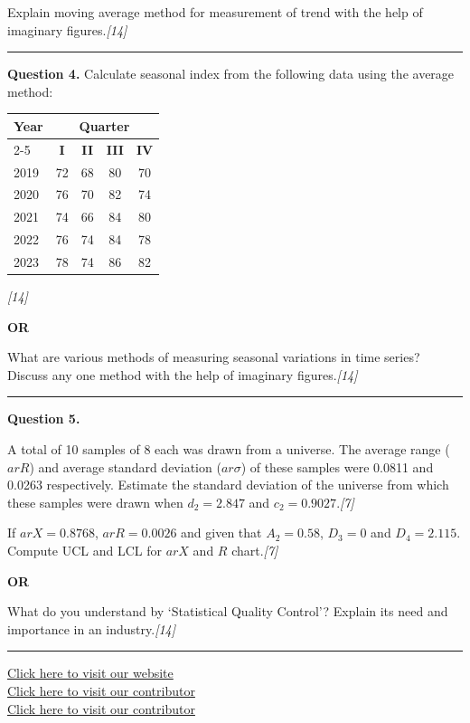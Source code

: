 \documentclass[11pt,a4paper]{article}
\newcommand{\pts}[1]{\hfill   \textit{[#1]}}
\begin{document}
Explain moving average method for measurement of trend with the help of imaginary figures.\pts{14}

\medskip\rule{\linewidth}{0.2pt}

\pagebreak




\noindent   \textbf{Question 4.}
Calculate seasonal index from the following data using the average method:


\begin{center}
\small

\begin{tabular}{|l|c|c|c|c|}
\hline
   \textbf{Year} & \multicolumn{4}{c|}{   \textbf{Quarter}} \\
\cline{2-5}
&   \textbf{I} &   \textbf{II} &   \textbf{III} &   \textbf{IV} \\
\hline
2019 & 72 & 68 & 80 & 70 \\
2020 & 76 & 70 & 82 & 74 \\
2021 & 74 & 66 & 84 & 80 \\
2022 & 76 & 74 & 84 & 78 \\
2023 & 78 & 74 & 86 & 82 \\
\hline
\end{tabular}
\end{center}\pts{14}

\centerline{   \textbf{OR}}

What are various methods of measuring seasonal variations in time series? Discuss any one method with the help of imaginary figures.\pts{14}

\medskip\rule{\linewidth}{0.2pt}




\noindent   \textbf{Question 5.}

\begin{parts}
  \item A total of 10 samples of 8 each was drawn from a universe. The average range ($ar{R}$) and average standard deviation ($ar{\sigma}$) of these samples were 0.0811 and 0.0263 respectively. Estimate the standard deviation of the universe from which these samples were drawn when $d_2 = 2.847$ and $c_2 = 0.9027$.\pts{7}
  \item If $ar{X} = 0.8768$, $ar{R} = 0.0026$ and given that $A_2 = 0.58$, $D_3 = 0$ and $D_4 = 2.115$. Compute UCL and LCL for $ar{X}$ and $R$ chart.\pts{7}
\end{parts}

\centerline{   \textbf{OR}}

What do you understand by `Statistical Quality Control'? Explain its need and importance in an industry.\pts{14}

\vfill
\rule{\linewidth}{0.4pt}

\begin{center}\small
\href{https://bhu-exam.vercel.app/}{Click here to visit our website}\\[4pt]
\href{https://me-aryan.vercel.app/}{Click here to visit our contributor}\\[4pt]
\href{https://quashan-me.vercel.app/}{Click here to visit our contributor}
\end{center}
\end{document}
